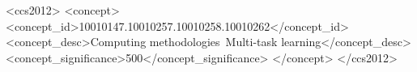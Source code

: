 \documentclass[sigconf]{acmart}
\begin{document}

\begin{CCSXML}
<ccs2012>
   <concept>
       <concept_id>10010147.10010257.10010258.10010262</concept_id>
       <concept_desc>Computing methodologies~Multi-task learning</concept_desc>
       <concept_significance>500</concept_significance>
       </concept>
 </ccs2012>
\end{CCSXML}


\end{document}
